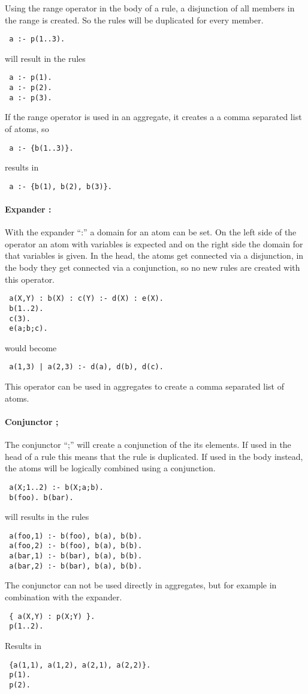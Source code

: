 \documentclass[a4paper,10pt]{article}
\begin{document}
Using the range operator in the body of a rule, a disjunction of all members in the range is created. So the rules will be duplicated for every member.
\begin{verbatim}
 a :- p(1..3).
\end{verbatim}
will result in the rules
\begin{verbatim}
 a :- p(1).
 a :- p(2).
 a :- p(3).
\end{verbatim}
If the range operator is used in an aggregate, it creates a a comma separated list of atoms, so
\begin{verbatim}
 a :- {b(1..3)}.
\end{verbatim}
results in
\begin{verbatim}
 a :- {b(1), b(2), b(3)}.
\end{verbatim}

\paragraph{Expander :}
With the expander ``:'' a domain for an atom can be set.
On the left side of the operator an atom with variables is expected and on the right side the domain for that variables is given.
In the head, the atoms get connected via a disjunction, in the body they get connected via a conjunction, so no new rules are created with this operator.
\begin{verbatim}
 a(X,Y) : b(X) : c(Y) :- d(X) : e(X).
 b(1..2).
 c(3).
 e(a;b;c).
\end{verbatim}
would become
\begin{verbatim}
 a(1,3) | a(2,3) :- d(a), d(b), d(c).
\end{verbatim}
This operator can be used in aggregates to create a comma separated list of atoms.

\paragraph{Conjunctor ;}
The conjunctor ``;'' will create a conjunction of the its elements.
If used in the head of a rule this means that the rule is duplicated.
If used in the body instead, the atoms will be logically combined using a conjunction.
\begin{verbatim}
 a(X;1..2) :- b(X;a;b).
 b(foo). b(bar).
\end{verbatim}
will results in the rules
\begin{verbatim}
 a(foo,1) :- b(foo), b(a), b(b).
 a(foo,2) :- b(foo), b(a), b(b).
 a(bar,1) :- b(bar), b(a), b(b).
 a(bar,2) :- b(bar), b(a), b(b).
\end{verbatim}
The conjunctor can not be used directly in aggregates, but for example in combination with the expander.
\begin{verbatim}
 { a(X,Y) : p(X;Y) }.
 p(1..2).
\end{verbatim}
Results in
\begin{verbatim}
 {a(1,1), a(1,2), a(2,1), a(2,2)}.
 p(1).
 p(2).
\end{verbatim}
\end{document}
